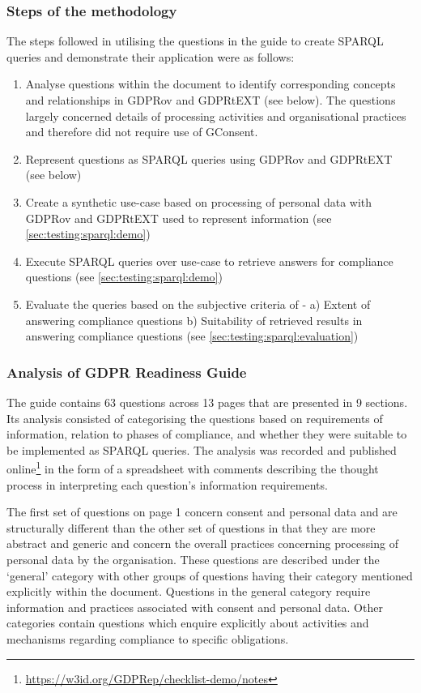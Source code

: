 \subsubsection{Steps of the methodology}
The steps followed in utilising the questions in the guide to create SPARQL queries and demonstrate their application were as follows:
\begin{enumerate}
    \item Analyse questions within the document to identify corresponding concepts and relationships in GDPRov and GDPRtEXT (see below). The questions largely concerned details of processing activities and organisational practices and therefore did not require use of GConsent.
    \item Represent questions as SPARQL queries using GDPRov and GDPRtEXT (see below)
    \item Create a synthetic use-case based on processing of personal data with GDPRov and GDPRtEXT used to represent information (see \autoref{sec:testing:sparql:demo})
    \item Execute SPARQL queries over use-case to retrieve answers for compliance questions (see \autoref{sec:testing:sparql:demo})
    \item Evaluate the queries based on the subjective criteria of - a) Extent of answering compliance questions b) Suitability of retrieved results in answering compliance questions (see \autoref{sec:testing:sparql:evaluation})
\end{enumerate}

\subsubsection{Analysis of GDPR Readiness Guide}
The guide contains 63 questions across 13 pages that are presented in 9 sections.
Its analysis consisted of categorising the questions based on requirements of information, relation to phases of compliance, and whether they were suitable to be implemented as SPARQL queries.
The analysis was recorded and published online\footnote{\url{https://w3id.org/GDPRep/checklist-demo/notes}} in the form of a spreadsheet with comments describing the thought process in interpreting each question's information requirements.

The first set of questions on page 1 concern consent and personal data and are structurally different than the other set of questions in that they are more abstract and generic and concern the overall practices concerning processing of personal data by the organisation.
These questions are described under the `general' category with other groups of questions having their category mentioned explicitly within the document.
Questions in the general category require information and practices associated with consent and personal data. Other categories contain questions which enquire explicitly about activities and mechanisms regarding compliance to specific obligations.

